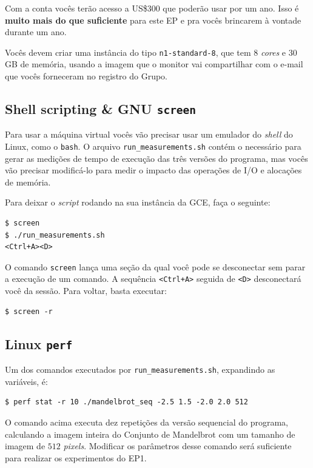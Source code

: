 \documentclass[final,12pt,a4paper]{elsarticle}
\begin{document}
Com a conta vocês terão acesso a US\$300 que poderão usar por um ano. Isso é
\textbf{muito mais do que suficiente} para este EP e pra vocês brincarem à
vontade durante um ano.

Vocês devem criar uma instância do tipo \texttt{n1-standard-8}, que tem 8
\textit{cores} e 30 GB de memória, usando a imagem que o monitor vai
compartilhar com o e-mail que vocês forneceram no registro do Grupo.

\subsection{Shell scripting \& GNU \texttt{screen}}

Para usar a máquina virtual vocês vão precisar usar um emulador do
\textit{shell} do Linux, como o \texttt{bash}.  O arquivo
\texttt{run\_measurements.sh} contém o necessário para gerar as medições de tempo
de execução das três versões do programa, mas vocês vão precisar modificá-lo
para medir o impacto das operações de I/O e alocações de memória.

Para deixar o \textit{script} rodando na sua instância da GCE, faça o seguinte:

\begin{lstlisting}
$ screen
$ ./run_measurements.sh
<Ctrl+A><D>
\end{lstlisting}

O comando \texttt{screen} lança uma seção da qual você pode se desconectar sem
parar a execução de um comando. A sequência \texttt{<Ctrl+A>} seguida de
\texttt{<D>} desconectará você da sessão. Para voltar, basta executar:

\begin{lstlisting}
$ screen -r
\end{lstlisting}

\subsection{Linux \texttt{perf}}

Um dos comandos executados por \texttt{run\_measurements.sh}, expandindo as
variáveis, é:

\begin{lstlisting}
$ perf stat -r 10 ./mandelbrot_seq -2.5 1.5 -2.0 2.0 512
\end{lstlisting}

O comando acima executa dez repetições da versão sequencial do programa,
calculando a imagem inteira do Conjunto de Mandelbrot com um tamanho de imagem
de $512$ \textit{pixels}. Modificar os parâmetros desse comando será suficiente
para realizar os experimentos do EP1.
\end{document}
